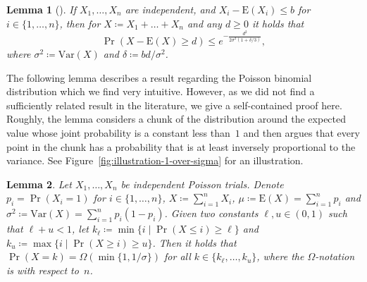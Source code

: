 \documentclass[11pt, a4paper]{article}
\newtheorem{lemma}{Lemma}
\DeclareMathOperator{\Prob}{Pr}
\newcommand*{\E}{\mathrm{E}}
\newcommand*{\Var}{\mathrm{Var}}
\begin{document}
\begin{lemma}[\cite{McDiarmid1998}] 
\label{lem:mcdiarmid}
If $X_1,\dots,X_n$ are independent, and $X_i-\E(X_i)\le b$ for 
$i\in\{1,\dots,n\}$, then for $X\coloneqq X_1+\dots+X_n$ and any $d\ge 0$ it holds 
that \[\Prob(X-\E(X)\ge d) \le e^{-\frac{d^2}{2\sigma^2(1+\delta/3)}},\]
where $\sigma^2 \coloneqq \Var(X)$ and $\delta \coloneqq bd/\sigma^2$.
\end{lemma}


The following lemma describes a result regarding the Poisson binomial distribution which 
we find very intuitive. However, as we did not find a sufficiently related result in the literature, 
we give a self-contained 
proof here. Roughly, the lemma considers a chunk of the distribution 
around the expected value 
whose joint probability is a constant less than~$1$ and then argues that every 
point in the chunk has a probability that is at least inversely proportional to the variance. 
See Figure~\ref{fig:illustration-1-over-sigma} for an illustration.
\begin{lemma}
\label{lem:at-least-1-over-sigma}
Let $X_1,\dots,X_n$ be independent Poisson trials. Denote $p_i=\Prob(X_i=1)$ for $i\in\{1,\dots,n\}$, 
$X\coloneqq \sum_{i=1}^n X_i$, 
$\mu\coloneqq \E(X)=\sum_{i=1}^n p_i$ and $\sigma^2\coloneqq \Var(X)=\sum_{i=1}^n p_i(1-p_i)$.
Given two constants $\ell,u\in(0,1)$ such that $\ell+u<1$, 
let $k_\ell\coloneqq \min\{i\mid \Prob(X\le i)\ge \ell\}$ and $k_u
\coloneqq \max\{i\mid \Prob(X\ge i)\ge u\}$. Then 
it holds that $\Prob(X=k)=\Omega(\min\{1,1/\sigma\})$ for all $k\in\{k_\ell,\dots,k_u\}$, where 
the $\Omega$-notation is with respect to~$n$.
\end{lemma}
 
\end{document}
